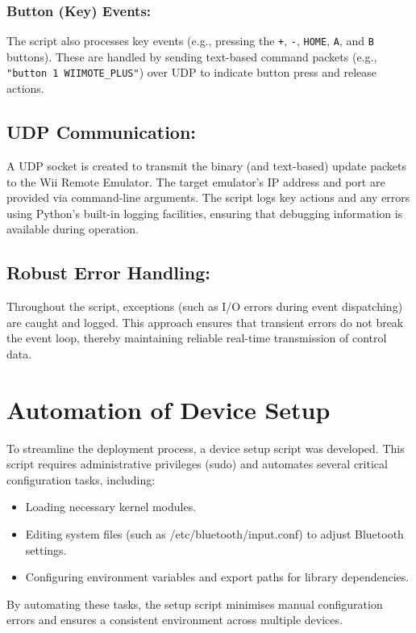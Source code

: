 \subsubsection*{Button (Key) Events:}
The script also processes key events (e.g., pressing the \texttt{+}, \texttt{-}, \texttt{HOME}, \texttt{A}, and \texttt{B} buttons). These are handled by sending text-based command packets (e.g., \texttt{"button 1 WIIMOTE\_PLUS"}) over UDP to indicate button press and release actions.

\subsection*{UDP Communication:}
A UDP socket is created to transmit the binary (and text-based) update packets to the Wii Remote Emulator. The target emulator’s IP address and port are provided via command-line arguments. The script logs key actions and any errors using Python’s built-in logging facilities, ensuring that debugging information is available during operation.

\subsection*{Robust Error Handling:}
Throughout the script, exceptions (such as I/O errors during event dispatching) are caught and logged. This approach ensures that transient errors do not break the event loop, thereby maintaining reliable real-time transmission of control data.

\section{Automation of Device Setup}

To streamline the deployment process, a device setup script was developed. This script requires administrative privileges (sudo) and automates several critical configuration tasks, including:

\begin{itemize}

	\item Loading necessary kernel modules.
	\item Editing system files (such as /etc/bluetooth/input.conf) to adjust Bluetooth settings.
	\item Configuring environment variables and export paths for library dependencies.
\end{itemize}

By automating these tasks, the setup script minimises manual configuration errors and ensures a consistent environment across multiple devices.

